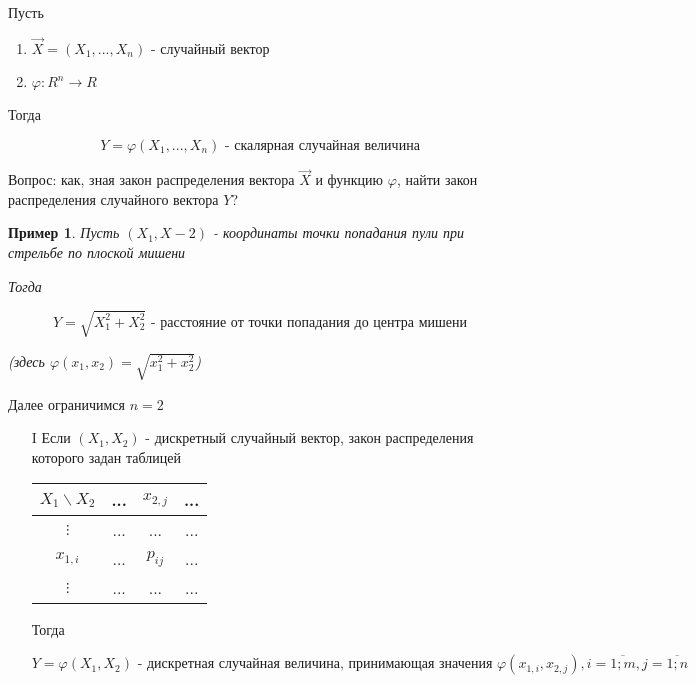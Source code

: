 \documentclass[a4paper, 14pt]{report}
\newtheorem{example}{Пример}[section]
\begin{document}
Пусть

\begin{enumerate}
    \item $\vec X = (X_1, ..., X_n)$ - случайный вектор
    \item $\varphi : R^n \to R$
\end{enumerate}

Тогда

$$
Y = \varphi(X_1,...,X_n) \text{ - скалярная случайная величина}
$$

Вопрос: как, зная закон распределения вектора $\vec X$ и функцию $\varphi$, найти закон распределения случайного вектора $Y$?

\begin{example}
    Пусть $(X_1, X-2)$ - координаты точки попадания пули при стрельбе по плоской мишени

    Тогда

    $$
    Y = \sqrt{X_1^2 + X_2^2} \text{ - расстояние от точки попадания до центра мишени}
    $$

    (здесь $\varphi(x_1, x_2) = \sqrt{x_1^2 + x_2^2}$)
\end{example}

Далее ограничимся $n=2$

\begin{enumerate}
    \item[I] Если $(X_1, X_2)$ - дискретный случайный вектор, закон распределения которого задан таблицей

        \begin{table}[H]
            \centering
            \begin{tabular}{|c||c|c|c|}
                \hline
                $X_1 \backslash X_2$ & ... & $x_{2,j}$ & ... \\
                \hline
                \hline
                $\vdots$ &  ... & ... & ... \\
                \hline
                $x_{1,i}$ & ... & $p_{ij}$ & ... \\
                \hline
                $\vdots$ &  ... & ... & ... \\
                \hline
            \end{tabular}
        \end{table}

        Тогда

        $$
        Y = \varphi(X_1, X_2) \text{ - дискретная случайная величина, принимающая значения } \varphi(x_{1,i}, x_{2,j}), i = \overline{1;m}, j = \overline{1;n}
        $$
\end{enumerate}
\end{document}
